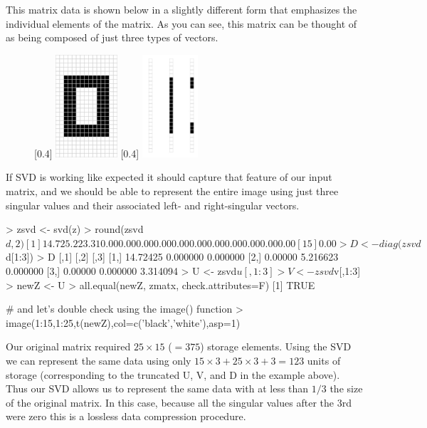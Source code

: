 \documentclass[11pt,letterpaper]{article}
\begin{document}
This matrix data is shown below in a slightly different form that emphasizes the individual elements of the matrix.  As you can see, this matrix can be thought of as being composed of just three types of vectors.


\begin{figure}[ht!]
\begin{center}
[0.4\linewidth]{%
\includegraphics[height=1.5in]{zero.jpg}%
}
[0.4\linewidth]{%
\includegraphics[height=1.5in]{zero-vecs.jpg}%
}
\end{center}
\end{figure}

If SVD is working like expected it should capture that feature of our input matrix, and we should be able to represent the entire image using just three singular values and their associated left- and right-singular vectors.

\begin{Rcode}
> zsvd <- svd(z)
> round(zsvd$d,2)
 [1] 14.72  5.22  3.31  0.00  0.00  0.00  0.00  0.00  0.00  0.00  0.00  0.00  0.00  0.00
[15]  0.00
> D <- diag(zsvd$d[1:3])
> D
         [,1]     [,2]     [,3]
[1,] 14.72425 0.000000 0.000000
[2,]  0.00000 5.216623 0.000000
[3,]  0.00000 0.000000 3.314094
> U <- zsvd$u[,1:3]
> V <- zsvd$v[,1:3]
> newZ <- U %
> all.equal(newZ, zmatx, check.attributes=F)
[1] TRUE

# and let's double check using the image() function
> image(1:15,1:25,t(newZ),col=c('black','white'),asp=1)
\end{Rcode}

Our original matrix required $25 \times 15$ ($= 375$) storage elements. Using the SVD we can represent the same data using only $15 \times 3 + 25 \times 3 + 3 = 123$ units of storage (corresponding to the truncated U, V, and D in the example above). Thus our SVD allows us to represent the same data with at less than $1/3$ the size of the original matrix. In this case, because all the singular values after the 3rd were zero this is a lossless data compression procedure. 
\end{document}

